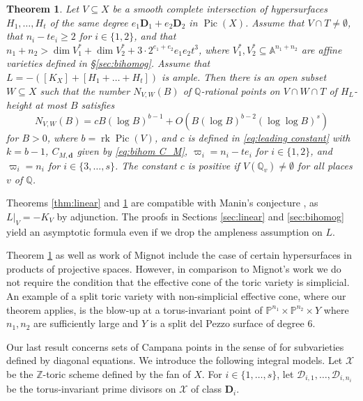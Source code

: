 \documentclass[10pt, a4paper, reqno, english]{amsart}
\newcommand\ZZ{\mathbb{Z}}
\newcommand\QQ{\mathbb{Q}}
\newcommand{\A}{\mathbb{A}} %
\newcommand{\divclass}{{\mathbf D}} %
\DeclareMathOperator{\pic}{Pic} %
\DeclareMathOperator{\rk}{rk} %
\newtheorem{theorem}{Theorem}
\theoremstyle{definition}
\numberwithin{theorem}{section}
\numberwithin{equation}{section}
\begin{document}
\begin{theorem}\label{thm:bihomog}
Let $V\subseteq X$ be a smooth complete intersection of hypersurfaces $H_1,\dots,H_t$ of the same degree $e_1\divclass_1+e_2\divclass_2$ in $\pic(X)$.  Assume that $V\cap T\neq\emptyset$, that $n_i-te_i\geq 2$ for $i\in\{1,2\}$, and that $n_1+n_2>\dim V_1^*+\dim V_2^* + 3\cdot 2^{e_1+e_2}e_1e_2t^3$, where $V_1^*, V_2^*\subseteq\A^{n_1+n_2}$ are  affine varieties defined in \S\ref{sec:bihomog}.
Assume that $L=-([K_X]+[H_1+\dots+H_t])$ is ample.
Then there is an open subset $W\subseteq X$ such that the number $N_{V,W}(B)$ of $\QQ$-rational points on $V\cap W\cap T$ of $H_L$-height  at most $B$ satisfies 
$$
N_{V,W}(B)=cB(\log B)^{b-1} +O(B(\log B)^{b-2}(\log\log B)^s)
$$
for $B>0$, where $b=\rk\pic(V)$, and $c$ is  defined in \eqref{eq:leading constant} with $k=b-1$,  $C_{M,\mathbf d}$ given by \eqref{eq:bihom C_M},
$\varpi_i=n_i-te_i$ for $i\in\{1,2\}$, and $\varpi_i=n_i$ for $i\in\{3,\dots,s\}$.
The constant $c$ is positive if $V(\QQ_v)\neq\emptyset$ for all places $v$ of $\QQ$.
\end{theorem}

Theorems \ref{thm:linear} and \ref{thm:bihomog} are compatible with Manin's conjecture \cite{MR0974910}, as $L|_V=-K_V$ by adjunction. The proofs in Sections \ref{sec:linear} and \ref{sec:bihomog} yield an asymptotic formula even if we drop the ampleness assumption on $L$.\par
Theorem \ref{thm:bihomog} as well as work of Mignot \cite{Mignot, mignot2} include the case of certain hypersurfaces in products of projective spaces. However, in comparison to Mignot's work we do not require the condition that the effective cone of the toric variety is simplicial. An example of a split toric variety with non-simplicial effective cone, where our theorem applies, is the blow-up at a torus-invariant point of $\mathbb{P}^{n_1}\times \mathbb{P}^{n_2} \times Y$ where $n_1,n_2$ are sufficiently large and $Y$ is a split del Pezzo surface of degree 6.\par

Our last result concerns sets of Campana points in the sense of \cite{PSTVA} for subvarieties defined by diagonal equations. We introduce the following integral models.
Let $\mathscr X$ be the $\ZZ$-toric scheme defined by the fan of $X$. For $i\in\{1,\dots,s\}$, let $\mathscr D_{i,1},\dots, \mathscr D_{i,n_i}$ be the torus-invariant prime divisors on $\mathscr X$ of class $\divclass_i$.
\end{document}
